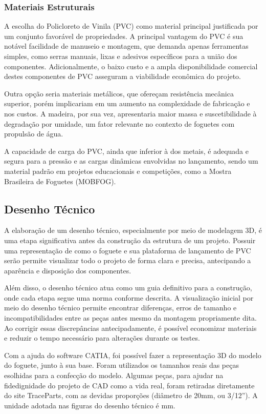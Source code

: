 \subsubsection{Materiais Estruturais}
A escolha do Policloreto de Vinila (PVC) como material principal justificada por um conjunto favorável de propriedades. A principal vantagem do PVC é sua notável facilidade de manuseio e montagem, que demanda apenas ferramentas simples, como serras manuais, lixas e adesivos específicos para a união dos componentes. Adicionalmente, o baixo custo e a ampla disponibilidade comercial destes componentes de PVC asseguram a viabilidade econômica do projeto. 

Outra opção seria materiais metálicos, que ofereçam resistência mecânica superior, porém implicariam em um aumento na complexidade de fabricação e nos custos. A madeira, por sua vez, apresentaria maior massa e suscetibilidade à degradação por umidade, um fator relevante no contexto de foguetes com propulsão de água. 

A capacidade de carga do PVC, ainda que inferior à dos metais, é adequada e segura para a pressão e as cargas dinâmicas envolvidas no lançamento, sendo um material padrão em projetos educacionais e competições, como a Mostra Brasileira de Foguetes (MOBFOG). 

\subsection{Desenho Técnico}

A elaboração de um desenho técnico, especialmente por meio de modelagem 3D, é uma etapa significativa antes da construção da estrutura de um projeto. Possuir uma representação de como o foguete e sua plataforma de lançamento de PVC serão permite visualizar todo o projeto de forma clara e precisa, antecipando a aparência e disposição dos componentes. 

 Além disso, o desenho técnico atua como um guia definitivo para a construção, onde cada etapa segue uma norma conforme descrita. A visualização inicial por meio do desenho técnico permite encontrar diferenças, erros de tamanho e incompatibilidades entre as peças antes mesmo da montagem propriamente dita. Ao corrigir essas discrepâncias antecipadamente, é possível economizar materiais e reduzir o tempo necessário para alterações durante os testes. 

Com a ajuda do software CATIA, foi possível fazer a representação 3D do modelo do foguete, junto à sua base. Foram utilizados os tamanhos reais das peças esolhidas para a confecção do modelo. Algumas peças, para ajudar na fidedignidade do projeto de CAD como a vida real, foram retiradas diretamente do site TraceParts, com as devidas proporções (diâmetro de 20mm, ou 3/12”). A unidade adotada nas figuras do desenho técnico é mm.

